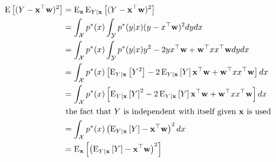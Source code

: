 \documentclass[twoside]{article}
\newcommand{\x}{{\bf x}}
\newcommand{\w}{{\bf w}}
\newcommand{\on}{\operatorname}
\newcommand{\E}{\on{E} }
\begin{document}
\begin{align*}
	\E\left[ (Y - \x^\top \w)^2 \right] &= \E_{\x}\E_{Y|{\x}}\left[ (Y - \x^\top \w)^2 \right]\\
	&=\int_{\mathcal{X}} p^*(x) \int_{\mathcal{Y}} p^*(y|x) (y - x^\top \w)^2 dy dx\\
	&=\int_{\mathcal{X}} p^*(x) \int_{\mathcal{Y}} p^*(y|x) y^2 - 2yx^\top\w + \w^\top xx^\top \w dy dx\\
	&=\int_{\mathcal{X}} p^*(x) \left[\E_{Y|\x}\left[Y^2\right] -2\E_{Y|\x}\left[Y\right]\x^\top\w+ \w^\top xx^\top \w \right]dx\\
	&=\int_{\mathcal{X}} p^*(x) \left[\E_{Y|\x}\left[Y\right]^2 -2\E_{Y|\x}\left[Y\right]\x^\top\w+ \w^\top xx^\top \w \right]dx\\
	&\text{ the fact that $Y$ is independent with itself given $\x$ is used}\\
	&=\int_{\mathcal{X}} p^*(x) \left( \E_{Y|{\x}}\left[ Y\right] - \x^\top\w \right)^2 dx\\
	&=\E_{\x}\left[ \left( \E_{Y|{\x}}\left[ Y\right] - \x^\top\w \right)^2 \right]
\end{align*}


\end{document}
